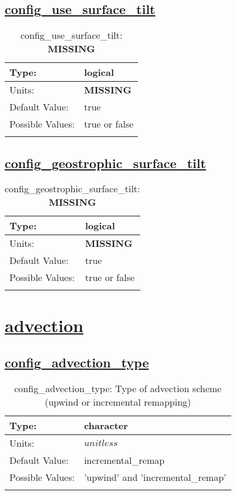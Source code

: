 \subsection[config\_use\_surface\_tilt]{\hyperref[sec:nm_tab_velocity_solver]{config\_use\_surface\_tilt}}
\label{subsec:nm_sec_config_use_surface_tilt}
\begin{center}
\begin{longtable}{| p{2.0in} || p{4.0in} |}
    \hline
    Type: & logical \\
    \hline
    Units: & {\bf \color{red} MISSING} \\
    \hline
    Default Value: & true \\
    \hline
    Possible Values: & true or false \\
    \hline
    \caption{config\_use\_surface\_tilt: {\bf \color{red} MISSING}}
\end{longtable}
\end{center}
\subsection[config\_geostrophic\_surface\_tilt]{\hyperref[sec:nm_tab_velocity_solver]{config\_geostrophic\_surface\_tilt}}
\label{subsec:nm_sec_config_geostrophic_surface_tilt}
\begin{center}
\begin{longtable}{| p{2.0in} || p{4.0in} |}
    \hline
    Type: & logical \\
    \hline
    Units: & {\bf \color{red} MISSING} \\
    \hline
    Default Value: & true \\
    \hline
    Possible Values: & true or false \\
    \hline
    \caption{config\_geostrophic\_surface\_tilt: {\bf \color{red} MISSING}}
\end{longtable}
\end{center}
\section[advection]{\hyperref[sec:nm_tab_advection]{advection}}
\label{sec:nm_sec_advection}
\subsection[config\_advection\_type]{\hyperref[sec:nm_tab_advection]{config\_advection\_type}}
\label{subsec:nm_sec_config_advection_type}
\begin{center}
\begin{longtable}{| p{2.0in} || p{4.0in} |}
    \hline
    Type: & character \\
    \hline
    Units: & $unitless$ \\
    \hline
    Default Value: & incremental\_remap \\
    \hline
    Possible Values: & 'upwind' and 'incremental\_remap' \\
    \hline
    \caption{config\_advection\_type: Type of advection scheme (upwind or incremental remapping)}
\end{longtable}
\end{center}
